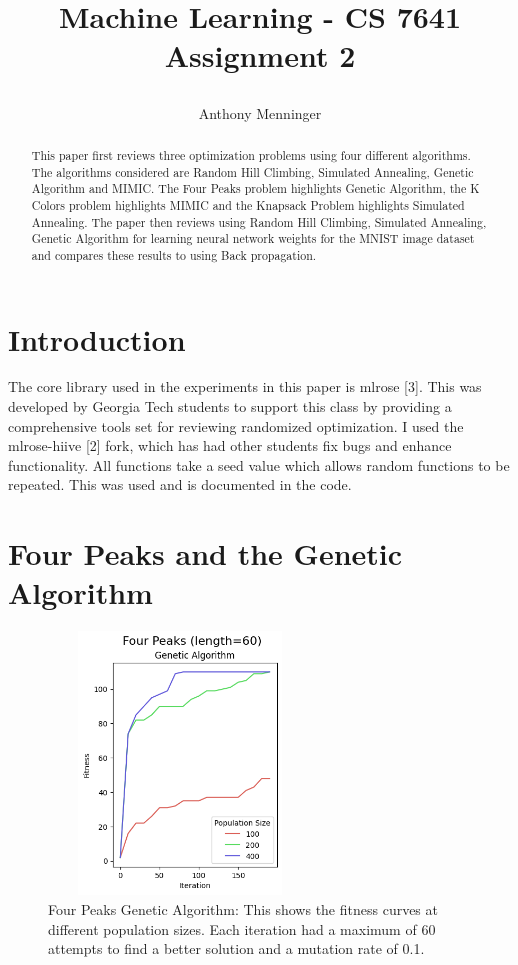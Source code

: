 \documentclass[letterpaper]{article} %
\title{
Machine Learning - CS 7641
Assignment 2
	
}
\author {
    Anthony Menninger \\
}
\begin{document}
\maketitle

\begin{abstract}
This paper first reviews three optimization problems using four different algorithms. The algorithms considered are Random Hill Climbing, Simulated Annealing, Genetic Algorithm and MIMIC.  The Four Peaks problem highlights Genetic Algorithm, the K Colors problem highlights MIMIC and the Knapsack Problem highlights Simulated Annealing.  The paper then reviews using Random Hill Climbing, Simulated Annealing, Genetic Algorithm for learning neural network weights for the MNIST image dataset and compares these results to using Back propagation.  
\end{abstract}

\section{Introduction}
The core library used in the experiments in this paper is mlrose [3].  This was developed by Georgia Tech students to support this class by providing a comprehensive tools set for reviewing randomized optimization.  I used the mlrose-hiive [2] fork, which has had other students fix bugs and enhance functionality.  All functions take a seed value which allows random functions to be repeated.  This was used and is documented in the code.

\section{Four Peaks and the Genetic Algorithm}
\begin{figure}[!htb]
\centering
\includegraphics[width=2.75in, height=2.75in]{figures/Four_Peaks_length=60_Genetic_Algorithm_l_60_ma_60_p_100__200__400_mu_0.1_.png}
\caption{Four Peaks Genetic Algorithm:  This shows the fitness curves at different population sizes. Each iteration had a maximum of 60 attempts to find a better solution and a mutation rate of 0.1. }
\label{fig:four_peaks_ga}
\end{figure}
\end{document}
